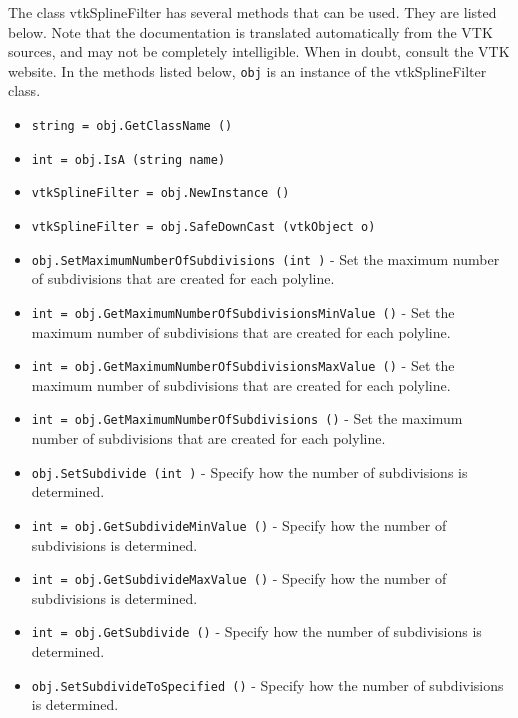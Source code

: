 The class vtkSplineFilter has several methods that can be used.
  They are listed below.
Note that the documentation is translated automatically from the VTK sources,
and may not be completely intelligible.  When in doubt, consult the VTK website.
In the methods listed below, \verb|obj| is an instance of the vtkSplineFilter class.
\begin{itemize}
\item  \verb|string = obj.GetClassName ()|

\item  \verb|int = obj.IsA (string name)|

\item  \verb|vtkSplineFilter = obj.NewInstance ()|

\item  \verb|vtkSplineFilter = obj.SafeDownCast (vtkObject o)|

\item  \verb|obj.SetMaximumNumberOfSubdivisions (int )| -  Set the maximum number of subdivisions that are created for each
 polyline.

\item  \verb|int = obj.GetMaximumNumberOfSubdivisionsMinValue ()| -  Set the maximum number of subdivisions that are created for each
 polyline.

\item  \verb|int = obj.GetMaximumNumberOfSubdivisionsMaxValue ()| -  Set the maximum number of subdivisions that are created for each
 polyline.

\item  \verb|int = obj.GetMaximumNumberOfSubdivisions ()| -  Set the maximum number of subdivisions that are created for each
 polyline.

\item  \verb|obj.SetSubdivide (int )| -  Specify how the number of subdivisions is determined.

\item  \verb|int = obj.GetSubdivideMinValue ()| -  Specify how the number of subdivisions is determined.

\item  \verb|int = obj.GetSubdivideMaxValue ()| -  Specify how the number of subdivisions is determined.

\item  \verb|int = obj.GetSubdivide ()| -  Specify how the number of subdivisions is determined.

\item  \verb|obj.SetSubdivideToSpecified ()| -  Specify how the number of subdivisions is determined.


\end{itemize}

